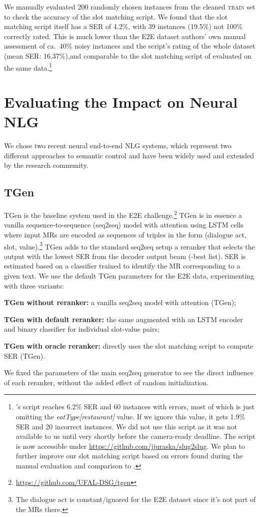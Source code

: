 \documentclass[11pt,a4paper]{article}
\newcommand{\squishlist}{
 \begin{list}{}
  { \setlength{\itemsep}{0pt}
     \setlength{\parsep}{2pt}
     \setlength{\topsep}{2pt}
     \setlength{\partopsep}{0pt}
     \setlength{\leftmargin}{1em}
     \setlength{\labelwidth}{1em}
     \setlength{\labelsep}{0.4em} } }
\newcommand{\squishend}{
  \end{list}  }
\begin{document}
We manually evaluated 200 randomly chosen instances from the cleaned \textsc{train} set to check the accuracy of the slot matching script. 
We found that the slot matching script itself has a SER of 4.2\%, with 39 instances (19.5\%) not 100\% correctly rated. 
This is much lower than the E2E dataset authors' own manual assessment of ca.~40\% noisy instances \cite{dusek_evaluating_2019} and the script's rating of the whole dataset (mean SER: 16.37\%),and comparable to the slot matching script of \citet{juraska_slug2slug:_2018} evaluated on the same data.\footnote{\citet{juraska_slug2slug:_2018}'s script reaches 6.2\% SER and 60 instances with errors, most of which is just omitting the \emph{eatType[restaurant]} value. If we ignore this value, it gets 1.9\% SER and 20 incorrect instances. We did not use this script as it was not available to us until very shortly before the camera-ready deadline. The script is now accessible under \url{https://github.com/jjuraska/slug2slug}. We plan to further improve our slot matching script based on errors found during the manual evaluation and comparison to \citet{juraska_slug2slug:_2018}.}



\section{Evaluating the Impact on Neural NLG}
\label{sec:evaluating-impact}

We chose two recent neural end-to-end NLG systems, which represent two
different approaches to semantic control and have been widely used and extended by the research community.  

\subsection{TGen}
\label{sec:tgen}

TGen \cite{Dusek:ACL16} is the baseline system used in the E2E challenge.\footnote{\url{https://github.com/UFAL-DSG/tgen}} TGen is in essence a vanilla sequence-to-sequence (seq2seq) model with attention \cite{bahdanau_neural_2015} using LSTM cells where input MRs are encoded as sequences of triples in the form (dialogue act, slot, value).\footnote{The dialogue act is constant/ignored for the E2E dataset since it's not part of the MRs there.} TGen adds to the standard seq2seq setup a reranker that selects the output with the lowest SER from the decoder output beam (-best list). SER is estimated based on a classifier trained to identify the MR corresponding to a given text.
We use the default TGen parameters for the E2E data, experimenting with three variants:
\squishlist
\item \textbf{TGen without reranker:} a vanilla seq2seq model with attention (TGen);
\item \textbf{TGen with default reranker:} the same augmented with an LSTM encoder and binary classifier for individual slot-value pairs;
\item \textbf{TGen with oracle reranker:} directly uses the slot matching script to compute SER (TGen).
\squishend
We fixed the parameters of the main seq2seq generator to see the direct influence of each reranker, without the added effect of random initialization.
\end{document}
